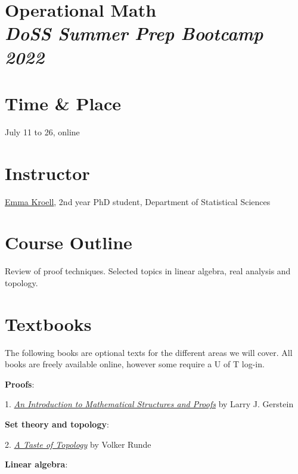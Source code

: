 \documentclass[12pt]{article}
\date{ }
\begin{document}
\section*{Operational Math\\  {\it{DoSS Summer Prep Bootcamp 2022}}}

\section{Time \& Place}
July 11 to 26, online

\section{Instructor}
\href{https://www.emmakroell.ca}{Emma Kroell}, 2nd year PhD student, Department of Statistical Sciences


\section{Course Outline}
Review of proof techniques. Selected topics in linear algebra, real analysis and topology.

\section{Textbooks}
The following books are optional texts for the different areas we will cover. All books are freely available online, however some require a U of T log-in.

\vspace{1em}

\noindent
{\bf{Proofs}}:
\vspace{0.1cm}

1. \href{https://link-springer-com.myaccess.library.utoronto.ca/book/10.1007/978-1-4614-4265-3}{{\emph{An Introduction to Mathematical Structures and Proofs}}} by Larry J. Gerstein

\vspace{1em}

\noindent
{\bf{Set theory and topology}}:
\vspace{0.1cm}

2. \href{https://link-springer-com.myaccess.library.utoronto.ca/book/10.1007/0-387-28387-0}{\emph{A Taste of Topology}} by Volker Runde

\vspace{1em}

\noindent
{\bf{Linear algebra}}:
\end{document}
